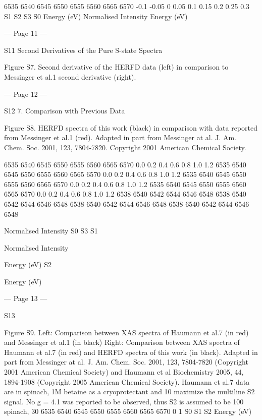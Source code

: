 6535 6540 6545 6550 6555 6560 6565 6570
-0.1
-0.05
0
0.05
0.1
0.15
0.2
0.25
0.3
S1
S2
S3
S0
 Energy (eV)
 Normalised Intensity
 Energy (eV)


--- Page 11 ---
 
S11 
Second Derivatives of the Pure S-state Spectra 
 
Figure S7. Second derivative of the HERFD data (left) in comparison to Messinger et al.1 second derivative 
(right). 
 
 


--- Page 12 ---
 
S12 
7. Comparison with Previous Data 
 
Figure S8. HERFD spectra of this work (black) in comparison with data reported from Messinger et al.1 (red). 
Adapted in part from Messinger at al. J. Am. Chem. Soc. 2001, 123, 7804-7820. Copyright 2001 American 
Chemical Society.  
 
 
6535
6540
6545
6550
6555
6560
6565
6570
0.0
0.2
0.4
0.6
0.8
1.0
1.2
6535
6540
6545
6550
6555
6560
6565
6570
0.0
0.2
0.4
0.6
0.8
1.0
1.2
6535
6540
6545
6550
6555
6560
6565
6570
0.0
0.2
0.4
0.6
0.8
1.0
1.2
6535
6540
6545
6550
6555
6560
6565
6570
0.0
0.2
0.4
0.6
0.8
1.0
1.2
6538 6540 6542 6544 6546 6548
6538 6540 6542 6544 6546 6548
6538 6540 6542 6544 6546 6548
6538 6540 6542 6544 6546 6548
 
 
Normalised Intensity
S0
S3
S1
 
 
 Normalised Intensity
 
 
Energy (eV)
S2
 
 
 
Energy (eV)


--- Page 13 ---
 
S13 
 
Figure S9. Left: Comparison between XAS spectra of Haumann et al.7 (in red) and Messinger et al.1 (in black) 
Right: Comparison between XAS spectra of Haumann et al.7 (in red) and HERFD spectra of this work (in black). 
Adapted in part from Messinger at al. J. Am. Chem. Soc. 2001, 123, 7804-7820 (Copyright 2001 American 
Chemical Society) and Haumann et al Biochemistry 2005, 44, 1894-1908 (Copyright 2005 American Chemical 
Society). 
Haumann et al.7 data are in spinach, 1M betaine as a cryoprotectant and 10%
maximize the multiline S2 signal. No g = 4.1 was reported to be observed, thus S2 is assumed to 
be 100%
spinach, 30%
6535 6540 6545 6550 6555 6560 6565 6570
0
1
S0
S1
S2
 Energy (eV)
 
